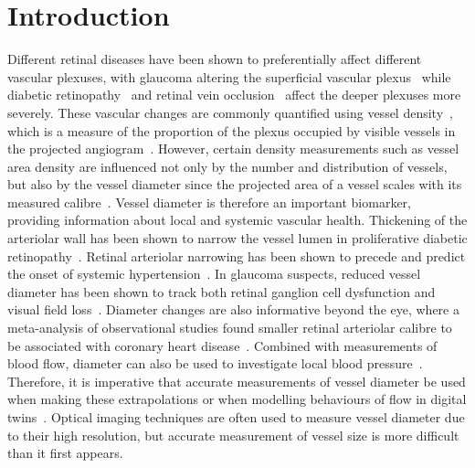 \documentclass{optica-article}
\begin{document}
\section{Introduction}

Different retinal diseases have been shown to preferentially affect different vascular plexuses, with glaucoma altering the superficial vascular plexus~\cite{takusagawaProjectionResolvedOptical2017} while diabetic retinopathy~\cite{hwangVisualization3Distinct2016} and retinal vein occlusion~\cite{coscasOpticalCoherenceTomography2016} affect the deeper plexuses more severely. These vascular changes are commonly quantified using vessel density~\cite{durbinQuantificationRetinalMicrovascular2017,yarmohammadiPeripapillaryMacularVessel2017,tzaridisQuantificationRetinalChoriocapillaris2019,kwapongRetinalMicrovascularImpairment2018}, which is a measure of the proportion of the plexus occupied by visible vessels in the projected angiogram~\cite{sampsonTowardsStandardizingRetinal2022,untrachtTowardsStandardisingRetinal2024}. However, certain density measurements such as vessel area density are influenced not only by the number and distribution of vessels, but also by the vessel diameter since the projected area of a vessel scales with its measured calibre~\cite{sampsonTowardsStandardizingRetinal2022,kimQuantifyingMicrovascularDensity2016}. Vessel diameter is therefore an important biomarker, providing information about local and systemic vascular health. Thickening of the arteriolar wall has been shown to narrow the vessel lumen in proliferative diabetic retinopathy~\cite{uenoAssociationChangesRetinal2021}. Retinal arteriolar narrowing has been shown to precede and predict the onset of systemic hypertension~\cite{ikramRetinalVesselDiameters2006}. In glaucoma suspects, reduced vessel diameter has been shown to track both retinal ganglion cell dysfunction and visual field loss~\cite{tirsiRetinalVesselDiameter2025}. Diameter changes are also informative beyond the eye, where a meta-analysis of observational studies found smaller retinal arteriolar calibre to be associated with coronary heart disease~\cite{liangRetinalVascularCaliber2022}. Combined with measurements of blood flow, diameter can also be used to investigate local blood pressure~\cite{mynardMeasurementAnalysisInterpretation2020,seabraSilicoBloodPressure2022}. Therefore, it is imperative that accurate measurements of vessel diameter be used when making these extrapolations or when modelling behaviours of flow in digital twins~\cite{hernandezLinkingVascularStructure2024,hernandezMicrovascularRetinalDigital2026}. Optical imaging techniques are often used to measure vessel diameter due to their high resolution, but accurate measurement of vessel size is more difficult than it first appears.
\end{document}
